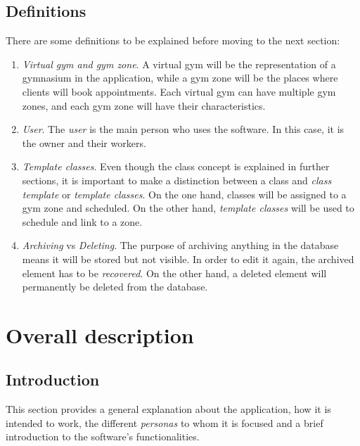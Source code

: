 \documentclass[a4paper, 12pt, oneside]{book}
\begin{document}
\subsection{Definitions}
There are some definitions to be explained before moving to the next section:
\begin{enumerate}[label = -]
	\item \emph{Virtual gym and gym zone}. A virtual gym will be the representation of a gymnasium in the application, while a gym zone will be the places where clients will book appointments. Each virtual gym can have multiple gym zones, and each gym zone will have their characteristics.
	\item \emph{User}. The \emph{user} is the main person who uses the software. In this case, it is the owner and their workers.
	\item \emph{Template classes}. Even though the class concept is explained in further sections, it is important to make a distinction between a class and \emph{class template} or \emph{template classes}. On the one hand, classes will be assigned to a gym zone and scheduled. On the other hand, \emph{template classes} will be used to schedule and link to a zone.
	\item \emph{Archiving} vs \emph{Deleting}. The purpose of archiving anything in the database means it will be stored but not visible. In order to edit it again, the archived element has to be \emph{recovered}. On the other hand, a deleted element will permanently be deleted from the database.
\end{enumerate}
\section{Overall description}
\subsection{Introduction}
This section provides a general explanation about the application, how it is intended to work, the different \emph{personas} to whom it is focused and a brief introduction to the software's functionalities.
\end{document}
